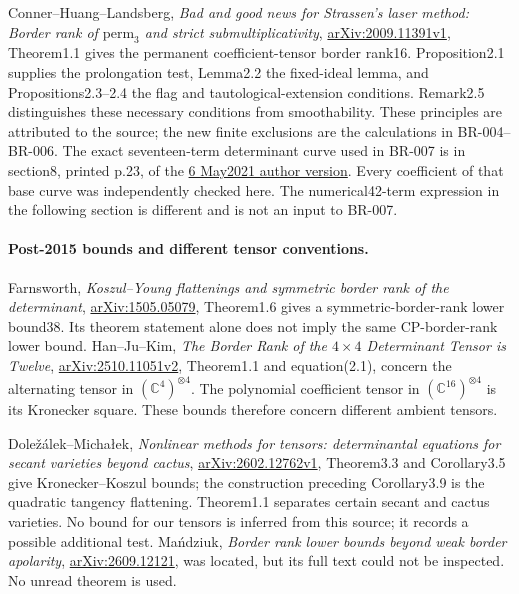 Conner--Huang--Landsberg, \emph{Bad and good news for Strassen's
laser method: Border rank of $\mathrm{perm}_3$ and strict
submultiplicativity},
\href{https://arxiv.org/abs/2009.11391v1}{arXiv:2009.11391v1},
Theorem1.1 gives the permanent coefficient-tensor border rank16.
Proposition2.1 supplies the prolongation test, Lemma2.2 the fixed-ideal
lemma, and Propositions2.3--2.4 the flag and tautological-extension
conditions. Remark2.5 distinguishes these necessary conditions from
smoothability. These principles are attributed to the source; the
new finite exclusions are the calculations in BR-004--BR-006.
The exact seventeen-term determinant curve used in BR-007 is in
section8, printed p.23, of the
\href{https://people.tamu.edu/~jml/CHLlaser5-6-21.pdf}{6 May2021 author version}.
Every coefficient of that base curve was independently checked here.
The numerical42-term expression in the following section is different
and is not an input to BR-007.

\paragraph{Post-2015 bounds and different tensor conventions.}
Farnsworth, \emph{Koszul--Young flattenings and symmetric border rank
of the determinant},
\href{https://arxiv.org/abs/1505.05079}{arXiv:1505.05079},
Theorem1.6 gives a symmetric-border-rank lower bound38. Its theorem
statement alone does not imply the same CP-border-rank lower bound.
Han--Ju--Kim, \emph{The Border Rank of the $4\times4$ Determinant
Tensor is Twelve},
\href{https://arxiv.org/abs/2510.11051v2}{arXiv:2510.11051v2},
Theorem1.1 and equation(2.1), concern the alternating tensor in
$(\mathbb C^4)^{\otimes4}$. The polynomial coefficient tensor in
$(\mathbb C^{16})^{\otimes4}$ is its Kronecker square. These bounds
therefore concern different ambient tensors.

Dole\v{z}\'alek--Micha\l ek, \emph{Nonlinear methods for tensors:
determinantal equations for secant varieties beyond cactus},
\href{https://arxiv.org/abs/2602.12762v1}{arXiv:2602.12762v1},
Theorem3.3 and Corollary3.5 give Kronecker--Koszul bounds; the
construction preceding Corollary3.9 is the quadratic tangency
flattening. Theorem1.1 separates certain secant and cactus varieties.
No bound for our tensors is inferred from this source; it records
a possible additional test. Ma\'ndziuk,
\emph{Border rank lower bounds beyond weak border apolarity},
\href{https://arxiv.org/abs/2609.12121}{arXiv:2609.12121}, was located,
but its full text could not be inspected. No unread theorem is used.


